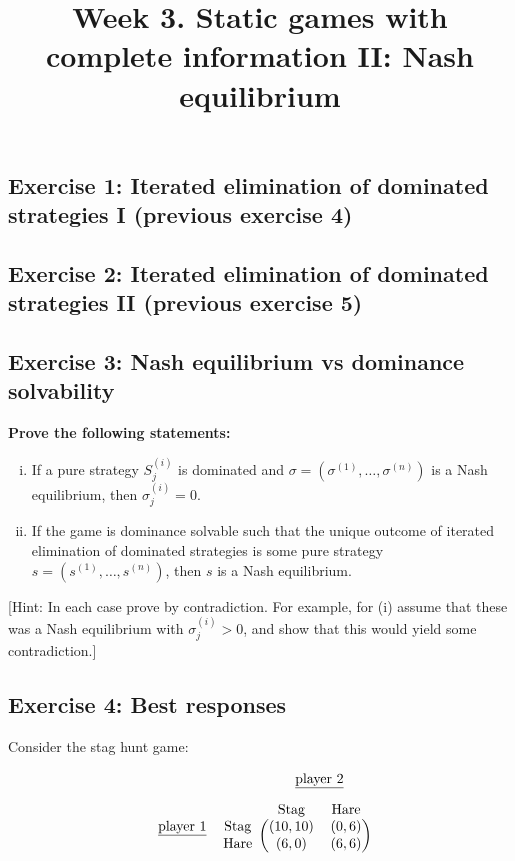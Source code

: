 \documentclass[10pt]{article}
\title{\textbf{Week 3.} Static games with complete information II: Nash equilibrium}
\date{}
\begin{document}
\maketitle
\vspace{-1cm}

\subsection*{Exercise 1: Iterated elimination of dominated strategies I (previous exercise 4)}

\subsection*{Exercise 2: Iterated elimination of dominated strategies II (previous exercise 5)}

\subsection*{Exercise 3: Nash equilibrium vs dominance solvability}

\textbf{Prove the following statements:}

\begin{enumerate}[(i)]
    \item If a pure strategy \(S^{(i)}_{j}\) is dominated and 
    \(\sigma = (\sigma^{(1)}, \dots, \sigma^{(n)})\) is a Nash equilibrium, then
    \(\sigma^{(i)}_{j}=0\).
    \item If the game is dominance solvable such that the unique outcome of
    iterated elimination of dominated strategies is some pure strategy
    \(s=(s^{(1)}, \dots, s^{(n)})\), then \(s\) is a Nash equilibrium.
\end{enumerate}


[Hint: In each case prove by contradiction. For example, for (i) assume that these was a
Nash equilibrium with \(\sigma^{(i)}_{j}>0\),
and show that this would yield some contradiction.]

\subsection*{Exercise 4: Best responses}

Consider the stag hunt game:

\begin{equation*}
    \begin{blockarray}{cccc}
       & & \BAmulticolumn{2}{c}{\underline{\text{player 2}}} \\ [1em]
       & & \text{Stag} & \text{Hare} \\
        \begin{block}{cc(cc)}
\underline{\text{player 1}} & \text{Stag} & (10, 10) & (0, 6) \\
                            & \text{Hare} & (6, 0) & (6, 6) \\
        \end{block}
    \end{blockarray}
\end{equation*}
\end{document}
